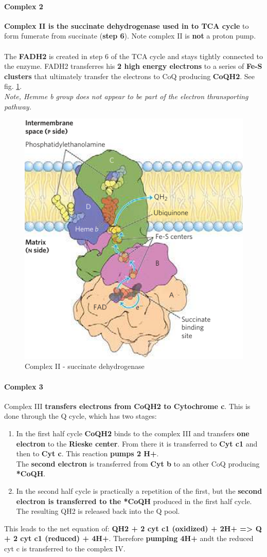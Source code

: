 \documentclass[../main.tex]{subfiles}
\begin{document}
\paragraph{Complex 2}
\textbf{Complex II is the succinate dehydrogenase used in to TCA cycle} to form fumerate from succinate (\textbf{step 6}). Note complex II is \textbf{not} a proton pump. \\
\\
The \textbf{FADH2} is created in step 6 of the TCA cycle and stays tightly connected to the enzyme. FADH2 transferres his \textbf{2 high energy electrons} to a series of \textbf{Fe-S clusters} that ultimately transfer the electrons to CoQ producing \textbf{CoQH2}. See fig. \ref{ETCC2}.\\
\textit{Note, Hemme b group does not appear to be part of the electron thransporting pathway. }

\begin{figure}[H]
	\centering
	\includegraphics[width = 0.5 \textwidth]{ETCC2}
	\caption{Complex II - succinate dehydrogenase}
	\label{ETCC2}
\end{figure}

\paragraph{Complex 3}
Complex III \textbf{transfers electrons from CoQH2 to Cytochrome c}. This is done through the Q cycle, which has two stages: 
\begin{enumerate}
	\item In the first half cycle \textbf{CoQH2} binds to the complex III and transfers \textbf{one electron} to the \textbf{Rieske center}. From there it is transferred to \textbf{Cyt c1} and then to \textbf{Cyt c}. This reaction \textbf{pumps 2 H+}.\\
	The \textbf{second electron} is transferred from \textbf{Cyt b} to an other CoQ producing \textbf{*CoQH}.
	\item In the second half cycle is practically a repetition of the first, but the \textbf{second electron is transferred to the *CoQH} produced in the first half cycle. The resulting QH2 is released back into the Q pool. 
\end{enumerate}
\noindent
This leads to the net equation of: \textbf{QH2 + 2 cyt c1 (oxidized) + 2H+ => Q + 2 cyt c1 (reduced) + 4H+}. Therefore \textbf{pumping 4H+} andt the reduced cyt c is transferred to the complex IV. 
\end{document}
